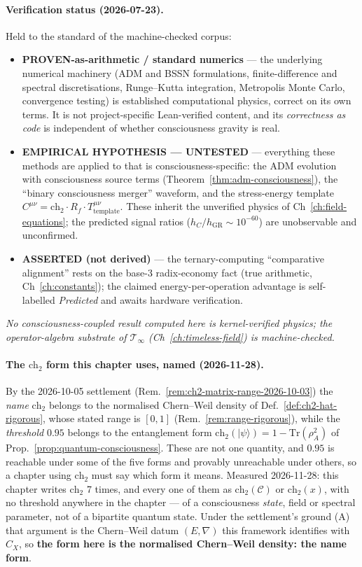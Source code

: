 \paragraph{Verification status (2026-07-23).}
Held to the standard of the machine-checked corpus:
\begin{itemize}
\item \textbf{PROVEN-as-arithmetic / standard numerics} --- the underlying numerical machinery (ADM and BSSN formulations, finite-difference and spectral discretisations, Runge--Kutta integration, Metropolis Monte Carlo, convergence testing) is established computational physics, correct on its own terms. It is not project-specific Lean-verified content, and its \emph{correctness as code} is independent of whether consciousness gravity is real.
\item \textbf{EMPIRICAL HYPOTHESIS --- UNTESTED} --- everything these methods are applied to that is consciousness-specific: the ADM evolution with consciousness source terms (Theorem~\ref{thm:adm-consciousness}), the ``binary consciousness merger'' waveform, and the stress-energy template $C^{\mu\nu}=\text{ch}_2\cdot R_f\cdot T^{\mu\nu}_{\text{template}}$. These inherit the unverified physics of Ch~\ref{ch:field-equations}; the predicted signal ratios ($h_C/h_{\text{GR}}\sim10^{-60}$) are unobservable and unconfirmed.
\item \textbf{ASSERTED (not derived)} --- the ternary-computing ``comparative alignment'' rests on the base-3 radix-economy fact (true arithmetic, Ch~\ref{ch:constants}); the claimed energy-per-operation advantage is self-labelled \emph{Predicted} and awaits hardware verification.
\end{itemize}
\emph{No consciousness-coupled result computed here is kernel-verified physics; the operator-algebra substrate of $\mathcal{T}_\infty$ (Ch~\ref{ch:timeless-field}) is machine-checked.}

\paragraph{The $\text{ch}_2$ form this chapter uses, named (2026-11-28).}
By the 2026-10-05 settlement (Rem.~\ref{rem:ch2-matrix-range-2026-10-03}) the
\emph{name} $\text{ch}_2$ belongs to the normalised Chern--Weil density of
Def.~\ref{def:ch2-hat-rigorous}, whose stated range is $[0,1]$
(Rem.~\ref{rem:range-rigorous}), while the \emph{threshold} $0.95$ belongs to the
entanglement form $\text{ch}_2(|\psi\rangle) = 1 - \mathrm{Tr}(\rho_A^2)$ of
Prop.~\ref{prop:quantum-consciousness}. These are not one quantity, and $0.95$ is
reachable under some of the five forms and provably unreachable under others, so a
chapter using $\text{ch}_2$ must say which form it means.
Measured 2026-11-28: this chapter writes $\text{ch}_2$ 7 times, and every one of them as $\text{ch}_2(\mathcal{C})$ or $\text{ch}_2(x)$, with no threshold anywhere in the chapter
--- of a consciousness \emph{state}, field or spectral parameter, not of a
bipartite quantum state. Under the settlement's ground (A) that argument is the
Chern--Weil datum $(E,\nabla)$ this framework identifies with $C_X$, so
\textbf{the form here is the normalised Chern--Weil density: the name form}.

